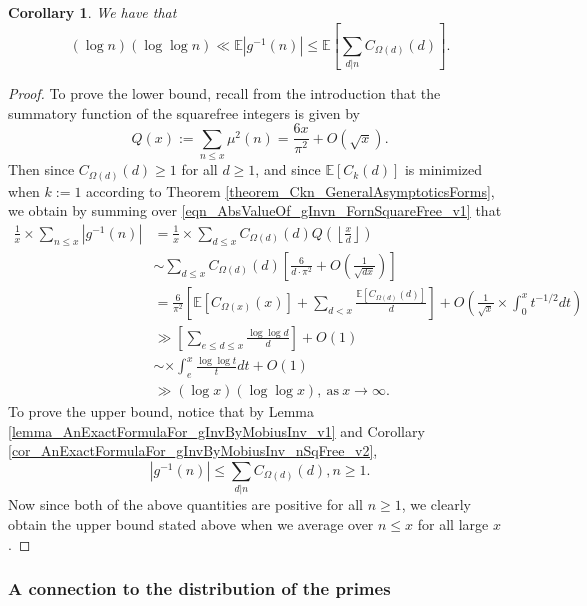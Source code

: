 \documentclass[11pt,reqno,a4letter]{article}
\numberwithin{figure}{section}
\numberwithin{table}{section}
\newcommand{\Floor}[2]{\ensuremath{\left\lfloor \frac{#1}{#2} \right\rfloor}}
\theoremstyle{plain}
\newtheorem{cor}[theorem]{Corollary}
\numberwithin{theorem}{section}
\theoremstyle{definition}
\begin{document}
\begin{cor} 
\label{lemma_BddExpectationOfgInvn} 
We have that 
\[
(\log n) (\log\log n) \ll 
     \mathbb{E}|g^{-1}(n)| \leq 
     \mathbb{E}\left[\sum_{d|n} C_{\Omega(d)}(d)\right]. 
\]
\end{cor} 
\begin{proof} 
To prove the lower bound, 
recall from the introduction that the summatory function of the 
squarefree integers is given by 
\[
Q(x) := \sum_{n \leq x} \mu^2(n) = \frac{6x}{\pi^2} + O(\sqrt{x}). 
\]
Then since $C_{\Omega(d)}(d) \geq 1$ for all $d \geq 1$, and since 
$\mathbb{E}[C_k(d)]$ is minimized when $k := 1$ according to 
Theorem \ref{theorem_Ckn_GeneralAsymptoticsForms}, 
we obtain by summing over 
\eqref{eqn_AbsValueOf_gInvn_FornSquareFree_v1} that 
\begin{align*} 
\frac{1}{x} \times \sum_{n \leq x} |g^{-1}(n)| & = \frac{1}{x} \times \sum_{d \leq x} 
     C_{\Omega(d)}(d) Q\left(\Floor{x}{d}\right) \\ 
     & \sim \sum_{d \leq x} C_{\Omega(d)}(d) \left[\frac{6}{d \cdot \pi^2} + O\left(\frac{1}{\sqrt{dx}}\right) 
     \right] \\ 
     & = \frac{6}{\pi^2} \left[\mathbb{E}[C_{\Omega(x)}(x)] + \sum_{d<x} 
     \frac{\mathbb{E}[C_{\Omega(d)}(d)]}{d}\right] + 
     O\left(\frac{1}{\sqrt{x}} \times \int_0^{x} t^{-1/2} dt\right) \\ 
     & \gg \left[\sum_{e \leq d \leq x} 
     \frac{\log\log d}{d}\right] + O(1) \\ 
     & \sim \times \int_{e}^{x} \frac{\log\log t}{t} dt + O(1) \\ 
     & \gg (\log x) (\log\log x), \mathrm{\ as\ } x \rightarrow \infty. 
\end{align*} 
To prove the upper bound, notice that by 
Lemma \ref{lemma_AnExactFormulaFor_gInvByMobiusInv_v1} and 
Corollary \ref{cor_AnExactFormulaFor_gInvByMobiusInv_nSqFree_v2}, 
\[
|g^{-1}(n)| \leq \sum_{d|n} C_{\Omega(d)}(d), n \geq 1. 
\]
Now since both of the above quantities are positive for all $n \geq 1$, 
we clearly obtain the upper bound stated above when we average over $n \leq x$ 
for all large $x$. 
\end{proof} 

\subsubsection{A connection to the distribution of the primes} 
\end{document}
